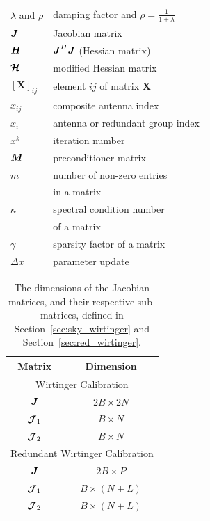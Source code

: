 \documentclass[useAMS,usenatbib]{mn2e}
\newcommand{\bJ}{\bmath{J}}
\newcommand{\bH}{\bmath{H}}
\newcommand{\bM}{\bmath{M}}
\newcommand{\bmJ}{\bmath{\mathcal{J}}}
\newcommand{\bmH}{\bmath{\mathcal{H}}}
\begin{document}
\begin{table}
\begin{tabular}{|l l|}
$\lambda$ and $\rho$ & damping factor and $\rho = \frac{1}{1+\lambda}$\\
$\bJ$ & Jacobian matrix\\
$\bH$ & $\bJ^H\bJ$ (Hessian matrix)\\
$\bmH$ & modified Hessian matrix\\
$[\mathbf{X}]_{ij}$& element $ij$ of matrix $\mathbf{X}$\\
$x_{ij}$ & composite antenna index\\
$x_i$ & antenna or redundant group index\\
$x^k$ & iteration number\\
$\bM$ & preconditioner matrix\\
$m$ & number of non-zero entries\\
&in a matrix\\
$\kappa$ & spectral condition number\\
&of a matrix\\
$\gamma$ & sparsity factor of a matrix\\
$\Delta x$ & parameter update\\
\hline
\end{tabular}
\label{tab:glossary}
\end{table}

\begin{table}
\centering
\caption{The dimensions of the Jacobian matrices, and their respective sub-matrices, defined in Section~\ref{sec:sky_wirtinger} and Section~\ref{sec:red_wirtinger}.}
\begin{tabular}{|c c|} 
\hline
Matrix & Dimension\\
\hline
\hline
\multicolumn{2}{c}{Wirtinger Calibration}\\
\hline
$\bJ$ & $2B \times 2N$ \\
$\bmJ_1$ & $B \times N$\\
$\bmJ_2$ & $B \times N$\\
\hline
\hline
\multicolumn{2}{c}{Redundant Wirtinger Calibration}\\
\hline
$\bJ$ & $2B \times P$ \\
$\bmJ_1$ & $B \times (N+L)$\\
$\bmJ_2$ & $B \times (N+L)$\\
\hline
\end{tabular}
\label{tab:matrix_dimensions_main}
\end{table}
\end{document}
